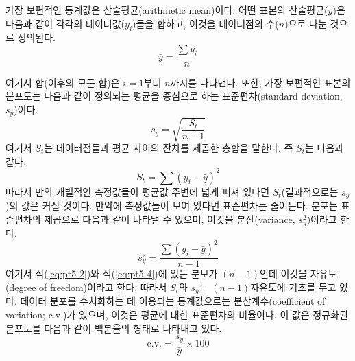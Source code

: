 가장 보편적인 통계값은 산술평균(arithmetic mean)이다. 어떤 표본의 산술평균($\bar{y}$)은 다음과 같이 각각의 데이터값($y_{i}$)들을 합하고, 이것을 데이터점의 수($n$)으로 나눈 것으로 정의된다.
\begin{equation}\label{eq:pt5-1}
\bar{y}=\frac{\sum y_{i}}{n}
\end{equation}

여기서 합(이후의 모든 합)은 $i=1$부터 $n$까지를 나타낸다.
또한, 가장 보편적인 표본의 분포도는 다음과 같이 정의되는 평균을 중심으로 하는 표준편차(standard deviation, $s_{y}$)이다.
\begin{equation}\label{eq:pt5-2}
s_{y}=\sqrt{\frac{S_{t}}{n-1}}
\end{equation}
여기서 $S_{t}$는 데이터점들과 평균 사이의 잔차를 제곱한 총합을 말한다. 즉 $S_{t}$는 다음과 같다.
\begin{equation}\label{eq:pt5-3}
S_{t}=\sum\left(y_{i}-\bar{y}\right)^{2}
\end{equation}
따라서 만약 개별적인 측정값들이 평균값 주변에 넓게 퍼져 있다면 $S_{t}$(결과적으로는 $s_{y}$)의 값은 커질 것이다. 만약에 측정값들이 모여 있다면 표준편차는 줄어든다. 분포는 표준편차의 제곱으로 다음과 같이 나타낼 수 있으며, 이것을 분산(variance, $s_{y}^2$)이라고 한다.
\begin{equation}\label{eq:pt5-4}
s_{y}^{2}=\frac{\sum\left(y_{i}-\bar{y}\right)^{2}}{n-1}
\end{equation}
여기서 식(\ref{eq:pt5-2})와 식(\ref{eq:pt5-4})에 있는 분모가 $(n-1)$인데 이것을 자유도(degree of freedom)이라고 한다. 따라서 $S_{t}$와 $s_{y}$는 $(n-1)$자유도에 기초를 두고 있다.
데이터 분포를 수치화하는 데 이용되는 통계값으로는 분산계수(coefficient of variation; c.v.)가 있으며, 이것은 평균에 대한 표준편차의 비율이다. 이 값은 정규화된 분포도를 다음과 같이 백분율의 형태로 나타내고 있다.
\begin{equation}\label{eq:pt5-5}
\text{c.v.}=\frac{s_{y}}{\bar{y}}\times 100
\end{equation}

